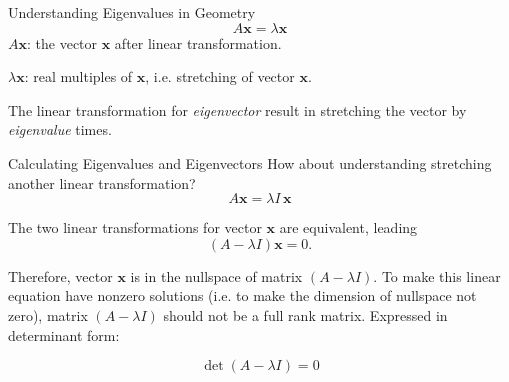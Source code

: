 \documentclass{beamer}
\begin{document}
\begin{frame}{Understanding Eigenvalues in Geometry}
\begin{equation*}
    A \mathbf{x}=\lambda \mathbf{x}
\end{equation*}
$A \mathbf{x}$: the vector $\mathbf{x}$ after linear transformation.

$\lambda \mathbf{x}$: real multiples of $\mathbf{x}$, i.e. stretching of vector $\mathbf{x}$.

The linear transformation for \textit{eigenvector} result in stretching the vector by \textit{eigenvalue} times.
\end{frame}

\begin{frame}{Calculating Eigenvalues and Eigenvectors}
How about understanding stretching another linear transformation?
\begin{equation*}
    A \mathbf{x}=\lambda I \,\mathbf{x}
\end{equation*}

The two linear transformations for vector $\mathbf{x}$ are equivalent, leading
\begin{equation*}
    \left(A-\lambda I \right) \mathbf{x}=0.
\end{equation*}

Therefore, vector $\mathbf{x}$ is in the nullspace of matrix $\left(A-\lambda I \right)$. To make this linear equation have nonzero solutions (i.e. to make the dimension of nullspace not zero), matrix $\left(A-\lambda I \right)$ should not be a full rank matrix. Expressed in determinant form:

\begin{equation*}
    \det \left( A-\lambda I \right) =0
\end{equation*}
\end{frame}
\end{document}
